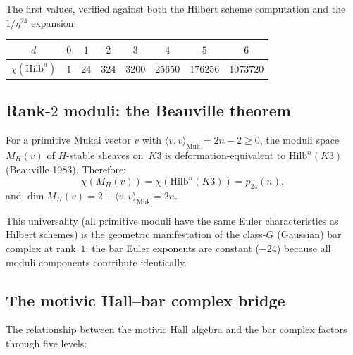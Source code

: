 The first values, verified against both the Hilbert scheme computation and the $1/\eta^{24}$ expansion:
\begin{center}
\begin{tabular}{c|ccccccc}
$d$ & $0$ & $1$ & $2$ & $3$ & $4$ & $5$ & $6$ \\ \hline
$\chi(\mathrm{Hilb}^d)$ & $1$ & $24$ & $324$ & $3200$ & $25650$ & $176256$ & $1073720$
\end{tabular}
\end{center}

\subsection{Rank-\texorpdfstring{$2$}{2} moduli: the Beauville theorem}
\label{subsec:k3e-rank2-beauville}

\begin{proposition}
\label{prop:k3e-beauville}
For a primitive Mukai vector $v$ with $\langle v, v \rangle_{\mathrm{Muk}} = 2n-2 \geq 0$, the moduli space $M_H(v)$ of $H$-stable sheaves on~$K3$ is deformation-equivalent to $\mathrm{Hilb}^n(K3)$ \textup{(Beauville 1983)}. Therefore:
\[
 \chi(M_H(v)) = \chi(\mathrm{Hilb}^n(K3)) = p_{24}(n),
\]
and $\dim M_H(v) = 2 + \langle v, v \rangle_{\mathrm{Muk}} = 2n$.
\end{proposition}

This universality (all primitive moduli have the same Euler characteristics as Hilbert schemes) is the geometric manifestation of the class-$G$ (Gaussian) bar complex at rank~$1$: the bar Euler exponents are constant ($-24$) because all moduli components contribute identically.

\subsection{The motivic Hall--bar complex bridge}
\label{subsec:k3e-hall-bar-bridge}

The relationship between the motivic Hall algebra and the bar complex factors through five levels:

